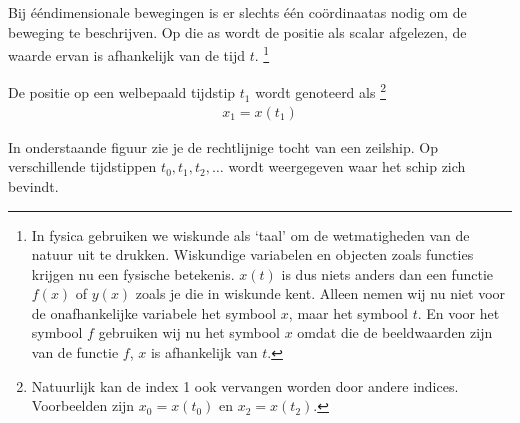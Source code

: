\documentclass{ximera}
\begin{document}
Bij ééndimensionale bewegingen is er slechts één coördinaatas nodig om de beweging te beschrijven. 
Op die as wordt de positie als scalar afgelezen, de waarde ervan is afhankelijk van de tijd \(t\). 
\footnote{In fysica gebruiken we wiskunde als `taal' om de wetmatigheden van de natuur uit te drukken. 
Wiskundige variabelen en objecten zoals functies krijgen nu een fysische betekenis. 
$x(t)$ is dus niets anders dan een functie $f(x)$ of $y(x)$ zoals je die in wiskunde kent. 
Alleen nemen wij nu niet voor de onafhankelijke variabele het symbool $x$, maar het symbool $t$. 
En voor het symbool $f$ gebruiken wij nu het symbool $x$ omdat die de beeldwaarden zijn van de functie \(f\), \(x\) is afhankelijk van \(t\).}


De positie op een welbepaald tijdstip $t_1$ wordt genoteerd als 
\footnote{Natuurlijk kan de index 1 ook vervangen worden door andere indices. Voorbeelden zijn $x_0=x(t_0)$ en $x_2=x(t_2)$.} 
\begin{eqnarray*}
x_1=x(t_1)
\end{eqnarray*}

In onderstaande figuur zie je de rechtlijnige tocht van een zeilship. 
Op verschillende tijdstippen $t_0,t_1, t_2,\ldots$ wordt weergegeven waar het schip zich bevindt. 



\begin{image}[0.8\textwidth]
\end{image}
\end{document}
